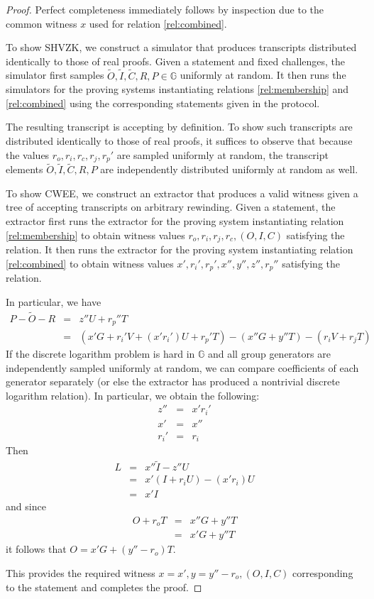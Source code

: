 \documentclass{article}
\theoremstyle{definition}
\newcommand{\GG}{\mathbb{G}}
\newcommand{\wt}[1]{\widetilde{#1}}
\begin{document}
\begin{proof}
	Perfect completeness immediately follows by inspection due to the common witness $x$ used for relation \ref{rel:combined}.

	To show SHVZK, we construct a simulator that produces transcripts distributed identically to those of real proofs.
	Given a statement and fixed challenges, the simulator first samples $\wt{O}, \wt{I}, \wt{C}, R, P \in \GG$ uniformly at random.
	It then runs the simulators for the proving systems instantiating relations \ref{rel:membership} and \ref{rel:combined} using the corresponding statements given in the protocol.

	The resulting transcript is accepting by definition.
	To show such transcripts are distributed identically to those of real proofs, it suffices to observe that because the values $r_o, r_i, r_c, r_j, r_p'$ are sampled uniformly at random, the transcript elements $\wt{O}, \wt{I}, \wt{C}, R, P$ are independently distributed uniformly at random as well.

	To show CWEE, we construct an extractor that produces a valid witness given a tree of accepting transcripts on arbitrary rewinding.
	Given a statement, the extractor first runs the extractor for the proving system instantiating relation \ref{rel:membership} to obtain witness values $r_o, r_i, r_j, r_c, (O, I, C)$ satisfying the relation.
	It then runs the extractor for the proving system instantiating relation \ref{rel:combined} to obtain witness values $x', r_i', r_p', x'', y'', z'', r_p''$ satisfying the relation.

	In particular, we have
	\begin{eqnarray*}
		P - \wt{O} - R &=& z'' U + r_p'' T \\
		&=& (x' G + r_i' V + (x' r_i') U + r_p' T) - (x'' G + y'' T) - (r_i V + r_j T)
	\end{eqnarray*}
	If the discrete logarithm problem is hard in $\GG$ and all group generators are independently sampled uniformly at random, we can compare coefficients of each generator separately (or else the extractor has produced a nontrivial discrete logarithm relation).
	In particular, we obtain the following:
	\begin{eqnarray*}
		z'' &=& x' r_i' \\
		x' &=& x'' \\
		r_i' &=& r_i
	\end{eqnarray*}
	Then
	\begin{eqnarray*}
		L &=& x'' \wt{I} - z'' U \\
		&=& x' (I + r_i U) - (x' r_i) U \\
		&=& x' I
	\end{eqnarray*}
	and since
	\begin{eqnarray*}
		O + r_o T &=& x'' G + y'' T \\
		&=& x' G + y'' T
	\end{eqnarray*}
	it follows that $O = x' G + (y'' - r_o) T$.

	This provides the required witness $x = x', y = y'' - r_o, (O, I, C)$ corresponding to the statement and completes the proof.
\end{proof}
\end{document}
